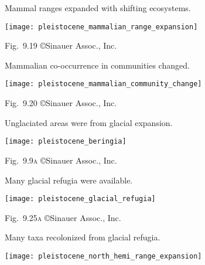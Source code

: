 \documentclass[t]{beamer}
\begin{document}
%
\begin{frame}[t]{Mammal ranges expanded with shifting ecosystems.}

	{\centering
		\texttt{[image: pleistocene\_mammalian\_range\_expansion]}\par
	}

	\vfilll

	\hfill \tiny Fig.~9.19 \copyright Sinauer Assoc., Inc.
\end{frame}
%
\begin{frame}[t]{Mammalian co-occurrence in communities changed.}

	{\centering
		\texttt{[image: pleistocene\_mammalian\_community\_change]}\par
	}

	\vfilll	

	\hfill \tiny Fig.~9.20 \copyright Sinauer Assoc., Inc.
\end{frame}
%
\begin{frame}{Unglaciated areas were  from glacial expansion.}

	{\centering
		\texttt{[image: pleistocene\_beringia]}\par
	}

	\vfilll

	\hfill \tiny Fig.~9.9\textsc{a} \copyright Sinauer Assoc., Inc.
\end{frame}
%
\begin{frame}{Many glacial refugia were available.}

	{\centering
		\texttt{[image: pleistocene\_glacial\_refugia]}\par
	}

	\vfilll

	\hfill \tiny Fig.~9.25\textsc{a} \copyright Sinauer Assoc., Inc.

\end{frame}
%
\begin{frame}{Many taxa recolonized from glacial refugia.}
	\vspace{-\baselineskip}
	\begin{center}
		\texttt{[image: pleistocene\_north\_hemi\_range\_expansion]}
	\end{center}
\end{frame}
%
\end{document}
